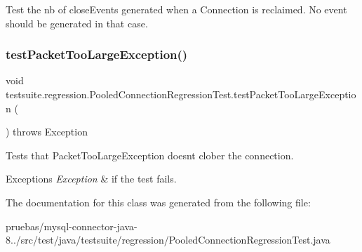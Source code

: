Test the nb of close\+Events generated when a Connection is reclaimed. No event should be generated in that case. \mbox{\label{classtestsuite_1_1regression_1_1_pooled_connection_regression_test_af108f826c529b646621b476cad0672d8}} 
\subsubsection{\texorpdfstring{test\+Packet\+Too\+Large\+Exception()}{testPacketTooLargeException()}}
{\footnotesize\ttfamily void testsuite.\+regression.\+Pooled\+Connection\+Regression\+Test.\+test\+Packet\+Too\+Large\+Exception (\begin{DoxyParamCaption}{ }\end{DoxyParamCaption}) throws Exception}

Tests that Packet\+Too\+Large\+Exception doesn\textquotesingle{}t clober the connection.


\begin{DoxyExceptions}{Exceptions}
{\em Exception} & if the test fails. \\
\hline
\end{DoxyExceptions}


The documentation for this class was generated from the following file\+:\begin{DoxyCompactItemize}
\item 
pruebas/mysql-\/connector-\/java-\/8../src/test/java/testsuite/regression/Pooled\+Connection\+Regression\+Test.\+java\end{DoxyCompactItemize}
